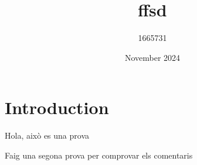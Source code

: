 \documentclass{article}
\title{ffsd}
\author{1665731 }
\date{November 2024}
\begin{document}
\maketitle

\section{Introduction}

Hola, això es una prova


Faig una segona prova per comprovar els comentaris
\end{document}
